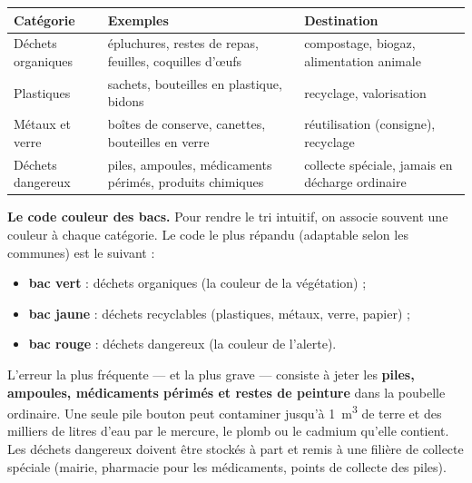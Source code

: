 \documentclass[11pt]{article}
\begin{document}
\begin{center}
\begin{tabularx}{\linewidth}{|l|X|X|}\hline
\rowcolor{popblueL} \textbf{Catégorie} & \textbf{Exemples} & \textbf{Destination} \\ \hline
Déchets organiques & épluchures, restes de repas, feuilles, coquilles d'{\oe}ufs & compostage, biogaz, alimentation animale \\ \hline
Plastiques & sachets, bouteilles en plastique, bidons & recyclage, valorisation \\ \hline
Métaux et verre & boîtes de conserve, canettes, bouteilles en verre & réutilisation (consigne), recyclage \\ \hline
Déchets dangereux & piles, ampoules, médicaments périmés, produits chimiques & collecte spéciale, jamais en décharge ordinaire \\ \hline
\end{tabularx}
\end{center}

\textbf{Le code couleur des bacs.} Pour rendre le tri intuitif, on associe souvent une couleur à chaque catégorie. Le code le plus répandu (adaptable selon les communes) est le suivant :

\begin{itemize}
\item \textbf{bac vert} : déchets organiques (la couleur de la végétation) ;
\item \textbf{bac jaune} : déchets recyclables (plastiques, métaux, verre, papier) ;
\item \textbf{bac rouge} : déchets dangereux (la couleur de l'alerte).
\end{itemize}

\begin{attention}
L'erreur la plus fréquente — et la plus grave — consiste à jeter les \textbf{piles, ampoules, médicaments périmés et restes de peinture} dans la poubelle ordinaire. Une seule pile bouton peut contaminer jusqu'à \SI{1}{m^3} de terre et des milliers de litres d'eau par le mercure, le plomb ou le cadmium qu'elle contient. Les déchets dangereux doivent être stockés à part et remis à une filière de collecte spéciale (mairie, pharmacie pour les médicaments, points de collecte des piles).
\end{attention}
\end{document}
